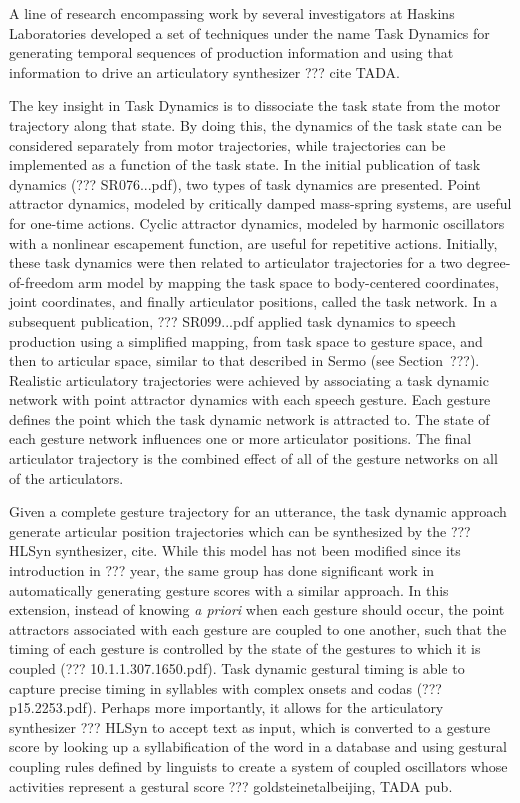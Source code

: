 A line of research encompassing work by
several investigators at Haskins Laboratories
developed a set of techniques
under the name Task Dynamics
for generating temporal sequences
of production information
and using that information to drive
an articulatory synthesizer
??? cite TADA.

The key insight in Task Dynamics
is to dissociate the task state
from the motor trajectory
along that state.
By doing this, the dynamics of the task state
can be considered separately from motor trajectories,
while trajectories can be implemented
as a function of the task state.
In the initial publication of task dynamics
(??? SR076...pdf),
two types of task dynamics are presented.
Point attractor dynamics,
modeled by critically damped mass-spring systems,
are useful for one-time actions.
Cyclic attractor dynamics,
modeled by harmonic oscillators
with a nonlinear escapement function,
are useful for repetitive actions.
Initially, these task dynamics were then
related to articulator trajectories
for a two degree-of-freedom arm model
by mapping the task space
to body-centered coordinates,
joint coordinates,
and finally articulator positions,
called the task network.
In a subsequent publication,
??? SR099...pdf
applied task dynamics to speech production
using a simplified mapping,
from task space
to gesture space,
and then to articular space,
similar to that described in Sermo
(see Section~???).
Realistic articulatory trajectories
were achieved
by associating a task dynamic network
with point attractor dynamics
with each speech gesture.
Each gesture defines
the point which the task dynamic network
is attracted to.
The state of each gesture network
influences one or more articulator positions.
The final articulator trajectory
is the combined effect
of all of the gesture networks
on all of the articulators.

Given a complete gesture trajectory
for an utterance,
the task dynamic approach
generate articular position trajectories
which can be synthesized
by the ??? HLSyn synthesizer, cite.
While this model has not been
modified since its introduction in ??? year,
the same group has done significant work
in automatically generating gesture scores
with a similar approach.
In this extension,
instead of knowing \textit{a priori}
when each gesture should occur,
the point attractors associated
with each gesture are coupled
to one another,
such that the timing of each gesture
is controlled by the state
of the gestures to which it is coupled
(??? 10.1.1.307.1650.pdf).
Task dynamic gestural timing
is able to capture precise timing
in syllables with complex onsets
and codas (??? p15.2253.pdf).
Perhaps more importantly,
it allows for the articulatory synthesizer
??? HLSyn to accept text as input,
which is converted to a gesture score
by looking up a syllabification
of the word in a database
and using gestural coupling rules
defined by linguists
to create a system of coupled oscillators
whose activities represent a gestural score
??? goldsteinetalbeijing, TADA pub.

